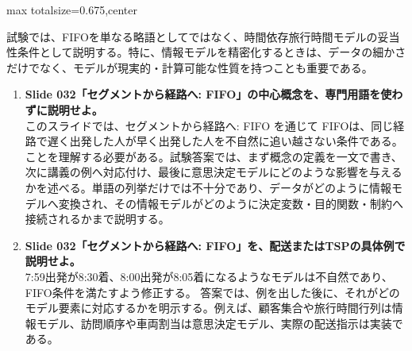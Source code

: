 \begin{adjustbox}{max totalsize={\textwidth}{0.675\textheight},center}
\begin{minipage}{\textwidth}
\begin{minipage}[t]{0.485\textwidth}
試験では、FIFOを単なる略語としてではなく、時間依存旅行時間モデルの妥当性条件として説明する。特に、情報モデルを精密化するときは、データの細かさだけでなく、モデルが現実的・計算可能な性質を持つことも重要である。\par
{}
\begin{enumerate}
\item \textbf{Slide 032「セグメントから経路へ: FIFO」の中心概念を、専門用語を使わずに説明せよ。}\\このスライドでは、セグメントから経路へ: FIFO を通じて FIFOは、同じ経路で遅く出発した人が早く出発した人を不自然に追い越さない条件である。 ことを理解する必要がある。試験答案では、まず概念の定義を一文で書き、次に講義の例へ対応付け、最後に意思決定モデルにどのような影響を与えるかを述べる。単語の列挙だけでは不十分であり、データがどのように情報モデルへ変換され、その情報モデルがどのように決定変数・目的関数・制約へ接続されるかまで説明する。
\item \textbf{Slide 032「セグメントから経路へ: FIFO」を、配送またはTSPの具体例で説明せよ。}\\7:59出発が8:30着、8:00出発が8:05着になるようなモデルは不自然であり、FIFO条件を満たすよう修正する。 答案では、例を出した後に、それがどのモデル要素に対応するかを明示する。例えば、顧客集合や旅行時間行列は情報モデル、訪問順序や車両割当は意思決定モデル、実際の配送指示は実装である。
\end{enumerate}
\end{minipage}
\end{minipage}
\end{adjustbox}

